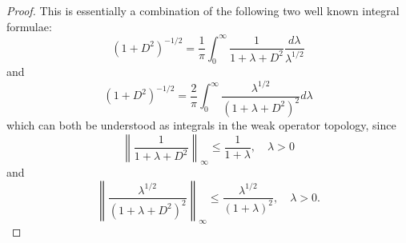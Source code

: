     \begin{proof} 
        This is essentially a combination of the following two { well known} integral formulae:
        \begin{equation}\label{little integral 1}
            (1+D^2)^{-1/2} = \frac{1}{\pi} \int_0^\infty \frac{1}{1+\lambda+D^2}\frac{d\lambda}{\lambda^{1/2}}
        \end{equation}
        and
        \begin{equation}\label{little integral 2}
            (1+D^2)^{-1/2} = \frac{2}{\pi} \int_0^\infty \frac{\lambda^{1/2}}{(1+\lambda+D^2)^2}d\lambda
        \end{equation}
        which can both be understood as integrals in the weak operator topology, since
        \begin{equation*}
            \left\|\frac{1}{1+\lambda+D^2}\right\|_\infty \leq \frac{1}{1+\lambda},\quad \lambda > 0
        \end{equation*}
        and
        \begin{equation*}
            \left\|\frac{\lambda^{1/2}}{(1+\lambda+D^2)^2}\right\|_\infty \leq \frac{\lambda^{1/2}}{(1+\lambda)^2},\quad\lambda > 0.
        \end{equation*}
        

\end{proof}

